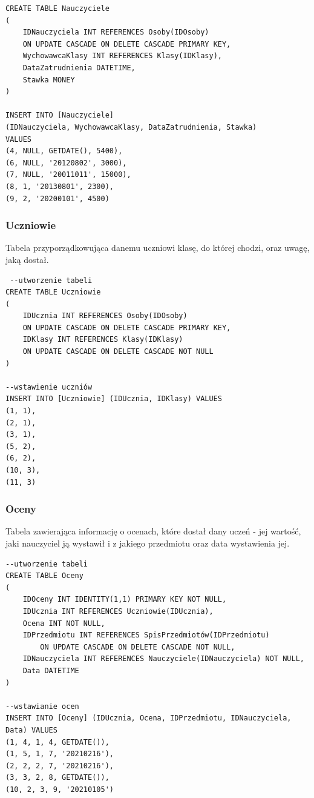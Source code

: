 \documentclass[60pt]{article}
\begin{document}
 \begin{verbatim}
CREATE TABLE Nauczyciele
(
    IDNauczyciela INT REFERENCES Osoby(IDOsoby)
    ON UPDATE CASCADE ON DELETE CASCADE PRIMARY KEY,
    WychowawcaKlasy INT REFERENCES Klasy(IDKlasy),
    DataZatrudnienia DATETIME,
    Stawka MONEY
)

INSERT INTO [Nauczyciele]
(IDNauczyciela, WychowawcaKlasy, DataZatrudnienia, Stawka)
VALUES
(4, NULL, GETDATE(), 5400),
(6, NULL, '20120802', 3000),
(7, NULL, '20011011', 15000),
(8, 1, '20130801', 2300),
(9, 2, '20200101', 4500)
\end{verbatim}
 
\subsubsection{Uczniowie}
Tabela przyporządkowująca danemu uczniowi klasę, do której chodzi, oraz uwagę, jaką dostał.
 
\begin{verbatim}
 --utworzenie tabeli
CREATE TABLE Uczniowie
(
    IDUcznia INT REFERENCES Osoby(IDOsoby) 
    ON UPDATE CASCADE ON DELETE CASCADE PRIMARY KEY,
    IDKlasy INT REFERENCES Klasy(IDKlasy) 
    ON UPDATE CASCADE ON DELETE CASCADE NOT NULL
)

--wstawienie uczniów
INSERT INTO [Uczniowie] (IDUcznia, IDKlasy) VALUES
(1, 1),
(2, 1),
(3, 1),
(5, 2),
(6, 2),
(10, 3),
(11, 3)
\end{verbatim}
 
 \subsubsection{Oceny}
Tabela zawierająca informację o ocenach, które dostał dany uczeń - jej wartość, jaki nauczyciel ją wystawił i z jakiego przedmiotu oraz data wystawienia jej.
 
\begin{verbatim}
--utworzenie tabeli
CREATE TABLE Oceny
(
    IDOceny INT IDENTITY(1,1) PRIMARY KEY NOT NULL,
    IDUcznia INT REFERENCES Uczniowie(IDUcznia),
    Ocena INT NOT NULL,
    IDPrzedmiotu INT REFERENCES SpisPrzedmiotów(IDPrzedmiotu)
        ON UPDATE CASCADE ON DELETE CASCADE NOT NULL,
    IDNauczyciela INT REFERENCES Nauczyciele(IDNauczyciela) NOT NULL,
    Data DATETIME
)

--wstawianie ocen
INSERT INTO [Oceny] (IDUcznia, Ocena, IDPrzedmiotu, IDNauczyciela, Data) VALUES
(1, 4, 1, 4, GETDATE()),
(1, 5, 1, 7, '20210216'),
(2, 2, 2, 7, '20210216'),
(3, 3, 2, 8, GETDATE()),
(10, 2, 3, 9, '20210105')
\end{verbatim}
\end{document}
